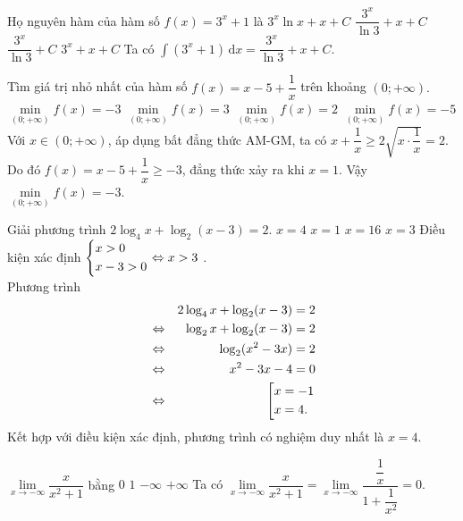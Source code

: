 \begin{ex}%
	Họ nguyên hàm của hàm số $f(x)=3^x+1 $ là
	\choice
	{$3^x \ln x +x + C$}
	{\True $\dfrac{3^x}{\ln 3}+x+ C$}
	{$\dfrac{3^x}{\ln 3}+C$}
	{$3^x +x+C$}
	\loigiai
	{ Ta có  $\displaystyle\int \left( 3^x+1 \right) \mathrm{\,d}x = \dfrac{3^x}{\ln 3}+x+ C $.
	}
\end{ex}

\begin{ex}%
	Tìm giá trị nhỏ nhất của hàm số $f(x)=x-5+\dfrac{1}{x}$ trên khoảng $(0;+\infty).$
	\choice
	{\True $\min\limits_{(0;+\infty)}f(x) =-3$}
	{$\min\limits_{(0;+\infty)}f(x) =3$}
	{$\min\limits_{(0;+\infty)}f(x) =2$}
	{$\min\limits_{(0;+\infty)} f(x) =-5$}
	\loigiai
	{ Với $ x \in (0;+\infty)$, áp dụng bất đẳng thức AM-GM, ta có $x+\dfrac{1}{x} \geq 2\sqrt{x\cdot \dfrac{1}{x}} =2$. \\
	Do đó $f(x)=x-5+\dfrac{1}{x} \geq -3$, đẳng thức xảy ra khi $x=1$. Vậy $\min\limits_{(0;+\infty)}f(x) =-3$.
	}
	
\end{ex}

\begin{ex}%
	Giải phương trình $2\log_4x+\log_2(x-3)=2.$
	\choice
	{\True $x=4$}
	{$x=1$}
	{$x=16$}
	{$x=3$}
	\loigiai
	{ Điều kiện xác định $\left\{\begin{aligned}& x >0\\& x-3>0\end{aligned}\right. \Leftrightarrow x >3$ .\\
			Phương trình  
			\begin{eqnarray*}
				& & 2\log_4x+\log_2(x-3)=2\\
				&\Leftrightarrow & \log_2x +\log_2(x-3)=2\\
				&\Leftrightarrow & \log_2 (x^2-3x)=2\\
				&\Leftrightarrow & x^2-3x-4=0\\
				& \Leftrightarrow & \left[\begin{aligned}&x=-1\\&x=4.\end{aligned}\right.
			\end{eqnarray*}	
		Kết hợp với điều kiện xác định, phương trình có nghiệm duy nhất là $x=4$.
		}
\end{ex}

\begin{ex}%
	$\lim\limits_{x \rightarrow - \infty}\dfrac{x}{x^2+1}$ bằng
	\choice
	{\True $0$}
	{$1$}
	{$-\infty $}
	{$+\infty $}
	\loigiai
	{ Ta có $\lim\limits_{x \rightarrow - \infty}\dfrac{x}{x^2+1}= \lim\limits_{x \rightarrow - \infty}\dfrac{\dfrac{1}{x}}{1+\dfrac{1}{x^2}}=0$.
	}
\end{ex}

